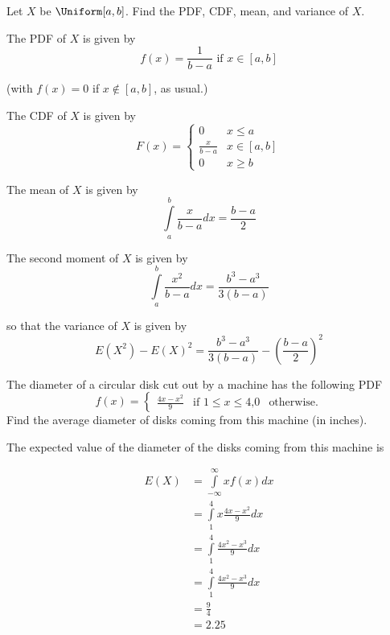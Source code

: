 \begin{problem}[Handout 12, \# 2]
  Let \(X\) be \(\Uniform[a,b]\). Find the PDF, CDF, mean, and variance of
  \(X\).
\end{problem}
\begin{solution}

The PDF of $X$ is given by
\[
f(x) = \frac{1}{b-a} \text{ if } x \in [a,b]
\]

(with $f(x) = 0$ if $x \notin [a,b]$, as usual.)

The CDF of $X$ is given by
\[ F(x) =

\begin{cases}
      0 & x\leq a \\
      \frac{x}{b-a} & x \in [a,b] \\
      0 & x \geq b
   \end{cases}
\]

The mean of $X$ is given by
\[
\int\limits_a^b \frac{x}{b-a} dx = \frac{b-a}{2}
\]

The second moment of $X$ is given by
\[
\int\limits_a^b \frac{x^2}{b-a} dx = \frac{b^3-a^3}{3(b-a)}
\]

so that the variance of $X$ is given by
\[
E(X^2) - E(X)^2 = \frac{b^3-a^3}{3(b-a)} - \left(\frac{b-a}{2}\right)^2
\]


\end{solution}
\newpage

\begin{problem}[Handout 12, \# 8]
  The diameter of a circular disk cut out by a machine has the following
  PDF
  \[f(x)=\begin{cases}
      \frac{4x-x^2}{9}&\text{if \(1\leq x\leq 4\),}
      0&\text{otherwise.}
    \end{cases}
  \]
  Find the average diameter of disks coming from this machine (in inches).
\end{problem}
\begin{solution}
The expected value of the diameter of the disks coming from this machine is

\begin{align*}
E(X) &= \int\limits_{-\infty}^\infty xf(x) dx\\
&= \int\limits_1^4 x \frac{4x-x^2}{9} dx\\
&= \int\limits_1^4 \frac{4x^2-x^3}{9} dx\\
&= \int\limits_1^4 \frac{4x^2-x^3}{9} dx\\
&= \frac{9}{4}\\
&= 2.25
\end{align*}


\end{solution}
\newpage

